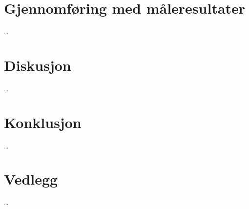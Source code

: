 \documentclass[12pt,a4paper]{article}
\begin{document}
\section{Gjennomføring med måleresultater}
\dots

\section{Diskusjon}
\dots

\section{Konklusjon}
\dots

\appendix
\section*{Vedlegg}
\dots

\printbibliography
\end{document}

